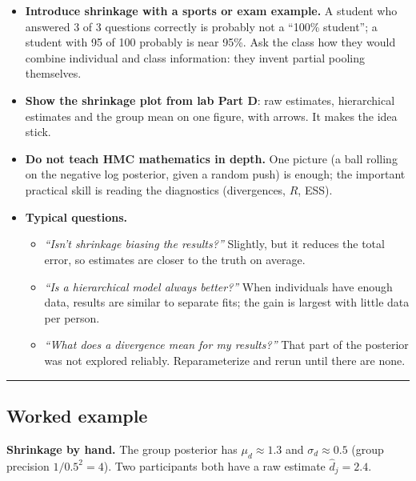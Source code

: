 \begin{itemize}
\tightlist
\item
  \textbf{Introduce shrinkage with a sports or exam example.} A student
  who answered 3 of 3 questions correctly is probably not a ``100\%
  student''; a student with 95 of 100 probably is near 95\%. Ask the
  class how they would combine individual and class information: they
  invent partial pooling themselves.
\item
  \textbf{Show the shrinkage plot from lab Part D}: raw estimates,
  hierarchical estimates and the group mean on one figure, with arrows.
  It makes the idea stick.
\item
  \textbf{Do not teach HMC mathematics in depth.} One picture (a ball
  rolling on the negative log posterior, given a random push) is enough;
  the important practical skill is reading the diagnostics (divergences,
  \(\hat R\), ESS).
\item
  \textbf{Typical questions.}

  \begin{itemize}
  \tightlist
  \item
    \emph{``Isn't shrinkage biasing the results?''} Slightly, but it
    reduces the total error, so estimates are closer to the truth on
    average.
  \item
    \emph{``Is a hierarchical model always better?''} When individuals
    have enough data, results are similar to separate fits; the gain is
    largest with little data per person.
  \item
    \emph{``What does a divergence mean for my results?''} That part of
    the posterior was not explored reliably. Reparameterize and rerun
    until there are none.
  \end{itemize}
\end{itemize}

\begin{center}\rule{0.5\linewidth}{0.5pt}\end{center}

\subsection{Worked example}

\textbf{Shrinkage by hand.} The group posterior has
\(\mu_d \approx 1.3\) and \(\sigma_d \approx 0.5\) (group precision
\(1/0.5^2 = 4\)). Two participants both have a raw estimate
\(\hat d_j = 2.4\).

